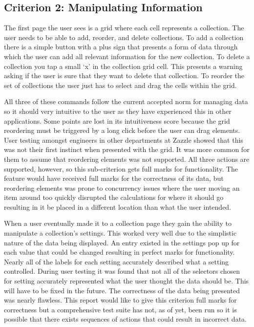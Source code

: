\documentclass[12pt]{article}
\begin{document}

\subsection{Criterion 2: Manipulating Information} %
\label{sub:criterion_2_manipulating_information}
The first page the user sees is a grid where each cell represents a collection. The user needs to be able to add, reorder, and delete collections. To add a collection there is a simple button with a plus sign that presents a form of data through which the user can add all relevant information for the new collection. To delete a collection you tap a small `x' in the collection grid cell. This presents a warning asking if the user is sure that they want to delete that collection. To reorder the set of collections the user just has to select and drag the cells within the grid. 

All three of these commands follow the current accepted norm for managing data so it should very intuitive to the user as they have experienced this in other applications. Some points are lost in its intuitiveness score because the grid reordering must be triggered by a long click before the user can drag elements. User testing amongst engineers in other departments at Zazzle showed that this was not their first instinct when presented with the grid. It was more common for them to assume that reordering elements was not supported. All three actions are supported, however, so this sub-criterion gets full marks for functionality. The feature would have received full marks for the correctness of its data, but reordering elements was prone to concurrency issues where the user moving an item around too quickly disrupted the calculations for where it should go resulting in it be placed in a different location than what the user intended.

When a user eventually made it to a collection page they gain the ability to manipulate a collection's settings. This worked very well due to the simplistic nature of the data being displayed. An entry existed in the settings pop up for each value that could be changed resulting in perfect marks for functionality. Nearly all of the labels for each setting accurately described what a setting controlled. During user testing it was found that not all of the selectors chosen for setting accurately represented what the user thought the data should be. This will have to be fixed in the future. The correctness of the data being presented was nearly flawless. This report would like to give this criterion full marks for correctness but a comprehensive test suite has not, as of yet, been run so it is possible that there exists sequences of actions that could result in incorrect data.
\end{document}
